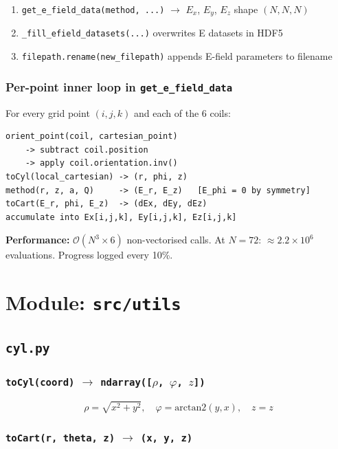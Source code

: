 \documentclass[11pt, a4paper]{article}
\begin{document}
\begin{enumerate}
    \item \texttt{get\_e\_field\_data(method, ...)} $\to$ $E_x$, $E_y$, $E_z$ shape $(N,N,N)$
    \item \texttt{\_fill\_efield\_datasets(...)} overwrites E datasets in HDF5
    \item \texttt{filepath.rename(new\_filepath)} appends E-field parameters to filename
\end{enumerate}

\subsubsection*{Per-point inner loop in \texttt{get\_e\_field\_data}}

For every grid point $(i,j,k)$ and each of the 6 coils:
\begin{lstlisting}[style=plain]
orient_point(coil, cartesian_point)
    -> subtract coil.position
    -> apply coil.orientation.inv()
toCyl(local_cartesian) -> (r, phi, z)
method(r, z, a, Q)     -> (E_r, E_z)   [E_phi = 0 by symmetry]
toCart(E_r, phi, E_z)  -> (dEx, dEy, dEz)
accumulate into Ex[i,j,k], Ey[i,j,k], Ez[i,j,k]
\end{lstlisting}

\noindent\textbf{Performance:} $\mathcal{O}(N^3 \times 6)$ non-vectorised calls.
At $N=72$: ${\approx}2.2\times10^6$ evaluations. Progress logged every 10\%.

\section{Module: \texttt{src/utils}}

\subsection{\texttt{cyl.py}}

\subsubsection*{\texttt{toCyl(coord)} $\to$ \texttt{ndarray([$\rho$, $\varphi$, $z$])}}

\[
\rho = \sqrt{x^2+y^2},\quad
\varphi = \mathrm{arctan2}(y,x),\quad
z = z
\]

\subsubsection*{\texttt{toCart(r, theta, z)} $\to$ \texttt{(x, y, z)}}
\end{document}
